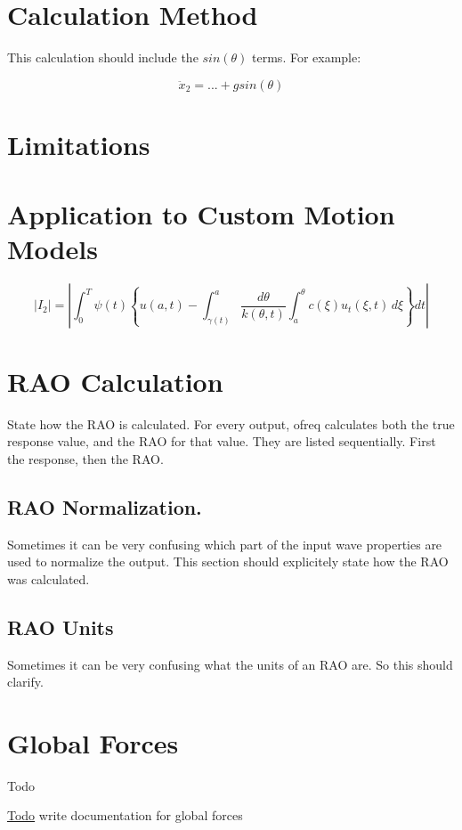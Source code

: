 \section*{Calculation Method}

This calculation should include the $ sin(\theta)$ terms. For example\-:

\[ \ddot x_2 = ... + g sin \left ( \theta \right ) \]

\section*{Limitations}

\section*{Application to Custom Motion Models}

\[ |I_2|=\left| \int_{0}^T \psi(t) \left\{ u(a,t)- \int_{\gamma(t)}^a \frac{d\theta}{k(\theta,t)} \int_{a}^\theta c(\xi)u_t(\xi,t)\,d\xi \right\} dt \right| \]

\section*{R\-A\-O Calculation}

State how the R\-A\-O is calculated. For every output, ofreq calculates both the true response value, and the R\-A\-O for that value. They are listed sequentially. First the response, then the R\-A\-O.

\subsection*{R\-A\-O Normalization.}

Sometimes it can be very confusing which part of the input wave properties are used to normalize the output. This section should explicitely state how the R\-A\-O was calculated.

\subsection*{R\-A\-O Units}

Sometimes it can be very confusing what the units of an R\-A\-O are. So this should clarify. \hypertarget{global_force}{}\section{Global Forces}\label{global_force}
\begin{DoxyRefDesc}{Todo}
\item[\hyperlink{todo__todo000020}{Todo}]write documentation for global forces\end{DoxyRefDesc}


